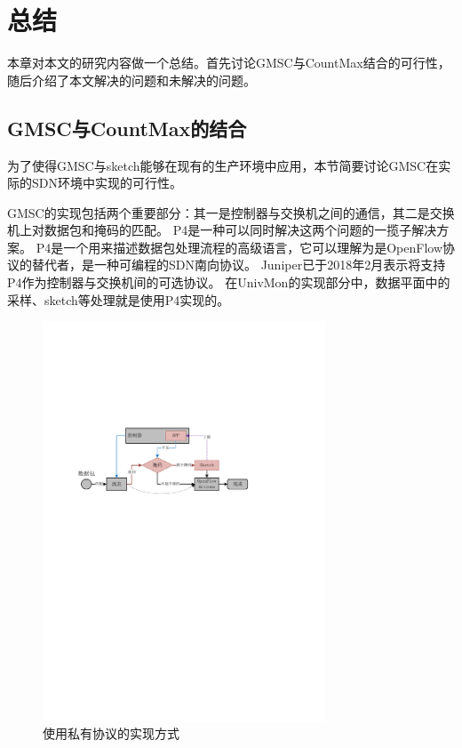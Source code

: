 \chapter{总结}
本章对本文的研究内容做一个总结。首先讨论GMSC与CountMax结合的可行性，随后介绍了本文解决的问题和未解决的问题。

\section{GMSC与CountMax的结合}

为了使得GMSC与sketch能够在现有的生产环境中应用，本节简要讨论GMSC在实际的SDN环境中实现的可行性。

GMSC的实现包括两个重要部分：其一是控制器与交换机之间的通信，其二是交换机上对数据包和掩码的匹配。
P4\cite{bosshart2014p4}是一种可以同时解决这两个问题的一揽子解决方案。
P4是一个用来描述数据包处理流程的高级语言，它可以理解为是OpenFlow协议的替代者，是一种可编程的SDN南向协议。
Juniper已于2018年2月表示将支持P4作为控制器与交换机间的可选协议\cite{juniper2018p4}。
在UnivMon\cite{liu2016one}的实现部分中，数据平面中的采样、sketch等处理就是使用P4实现的。

\begin{figure}[ht]
	\centering
	\includegraphics[width=0.75\textwidth]{fig/private.pdf}
	\caption{使用私有协议的实现方式}
	\label{fig:private}
\end{figure}

